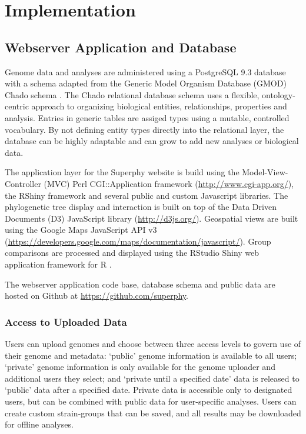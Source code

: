 \documentclass[doublespacing, linenumbers]{bmcart}
\begin{document}
\section{Implementation}
\subsection{Webserver Application and Database}

Genome data and analyses are administered using a PostgreSQL 9.3 database with a schema adapted from the Generic Model Organism Database (GMOD) Chado schema \cite{mungall_chado_2007}. The Chado relational database schema uses a flexible, ontology-centric approach to organizing biological entities, relationships, properties and analysis. Entries in generic tables are assiged types using a mutable, controlled vocabulary. By not defining entity types directly into the relational layer, the database can be highly adaptable and can grow to add new analyses or biological data.

The application layer for the Superphy website is build using the Model-View-Controller (MVC) Perl CGI::Application framework (\url{http://www.cgi-app.org/}), the RShiny framework and several public and custom Javascript libraries. The phylogenetic tree display and interaction is built on top of the Data Driven Documents (D3) JavaScript library (\url{http://d3js.org/}). Geospatial views are built using the Google Maps JavaScript API v3 (\url{https://developers.google.com/maps/documentation/javascript/}). Group comparisons are processed and displayed using the RStudio Shiny web application framework for R \cite{racine_rstudio:_2012}.

The webserver application code base, database schema and public data are hosted on Github at \url{https://github.com/superphy}.

\subsubsection{Access to Uploaded Data}
Users can upload genomes and choose between three access levels to govern use of their genome and metadata: `public' genome information is available to all users; `private' genome information is only available for the genome uploader and additional users they select; and `private until a specified date' data is released to `public' data after a specified date. Private data is accessible only to designated users, but can be combined with public data for user-specific analyses. Users can create custom strain-groups that can be saved, and all results may be downloaded for offline analyses.
\end{document}
